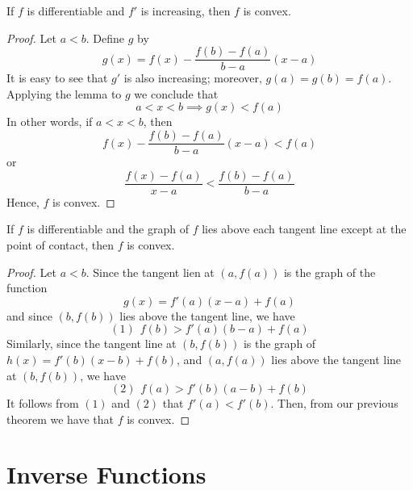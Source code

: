 \documentclass[12pt, a4paper, oneside, openright, titlepage]{book}
\begin{document}
\begin{thm}
    If $f$ is differentiable and $f'$ is increasing, then $f$ is convex.
\end{thm}
\begin{proof}
    Let $a < b$. Define $g$ by \begin{equation*}
        g(x) = f(x) - \frac{f(b) - f(a)}{b-a}(x-a)
    \end{equation*}
    It is easy to see that $g'$ is also increasing; moreover, $g(a) = g(b) = f(a)$. Applying the lemma to $g$ we conclude that $$a < x < b \implies g(x) < f(a)$$
    In other words, if $a < x < b$, then \begin{equation*}
        f(x) - \frac{f(b) - f(a)}{b-a}(x-a) < f(a)
    \end{equation*}
    or \begin{equation*}
        \frac{f(x) - f(a)}{x-a} < \frac{f(b) - f(a)}{b-a}
    \end{equation*}
    Hence, $f$ is convex.
\end{proof}


\begin{thm}
    If $f$ is differentiable and the graph of $f$ lies above each tangent line except at the point of contact, then $f$ is convex.
\end{thm}
\begin{proof}
    Let $a < b$. Since the tangent lien at $(a,f(a))$ is the graph of the function \begin{equation*}
        g(x) = f'(a)(x-a) + f(a)
    \end{equation*}
    and since $(b,f(b))$ lies above the tangent line, we have \begin{equation*}
        (1)\hspace{5pt}f(b) > f'(a)(b-a) + f(a)
    \end{equation*}
    Similarly, since the tangent line at $(b,f(b))$ is the graph of $h(x) =f'(b)(x-b) + f(b)$, and $(a,f(a))$ lies above the tangent line at $(b,f(b))$, we have \begin{equation*}
        (2)\hspace{5pt}f(a) > f'(b)(a-b) + f(b)
    \end{equation*}
    It follows from $(1)$ and $(2)$ that $f'(a) < f'(b)$. Then, from our previous theorem we have that $f$ is convex.
\end{proof}



\section{Inverse Functions}
\end{document}

